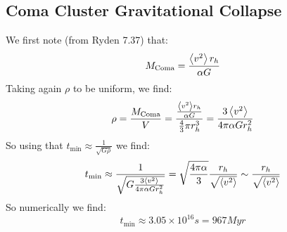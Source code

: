 \subsection{Coma Cluster Gravitational Collapse}
We first note (from Ryden 7.37) that:
\begin{equation}
    M_{\text{Coma}} = \frac{\left< v^2 \right>r_h}{\alpha G}
\end{equation}
Taking again $\rho$ to be uniform, we find:
\begin{equation}
    \rho = \frac{M_{\text{Coma}}}{V} = \frac{\frac{\left< v^2 \right>r_h}{\alpha G}}{\frac{4}{3}\pi r_h^3} = \frac{3\left< v^2 \right>}{4\pi\alpha G r_h^2}
\end{equation}
So using that $t_{\text{min}} \approx \frac{1}{\sqrt{G\rho}}$ we find:
\begin{equation}
    t_{\text{min}} \approx \frac{1}{\sqrt{G \frac{3\left< v^2 \right>}{4\pi\alpha G r_h^2}}} = \sqrt{\frac{4\pi \alpha}{3}}\frac{r_h}{\sqrt{\left< v^2 \right>}} \sim \frac{r_h}{\sqrt{\left< v^2 \right>}} 
\end{equation}
So numerically we find: 
\begin{equation}
    \boxed{t_{\text{min}} \approx 3.05 \times 10^{16}\si{s} = 967\si{Myr}}
\end{equation}

